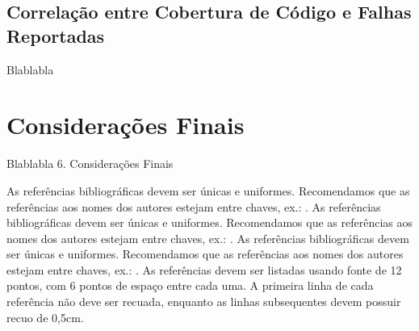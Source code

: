 \documentclass[11.5pt]{article}
\begin{document}

\subsection{Correlação entre Cobertura de Código e Falhas Reportadas}
Blablabla




\section{Considerações Finais}
Blablabla
6. Considerações Finais




As referências bibliográficas devem ser únicas e uniformes. Recomendamos que as referências aos nomes dos autores estejam entre chaves, ex.: \cite{knuth:84}.
As referências bibliográficas devem ser únicas e uniformes. Recomendamos que as referências aos nomes dos autores estejam entre chaves, ex.: \cite{boulic:91}.
As referências bibliográficas devem ser únicas e uniformes. Recomendamos que as referências aos nomes dos autores estejam entre chaves, ex.: \cite{smith:99}.
As referências devem ser listadas usando fonte de 12 pontos, com 6 pontos de espaço entre cada uma. A primeira linha de cada referência não deve ser recuada, enquanto as linhas subsequentes devem possuir recuo de 0,5cm.



\end{document}
